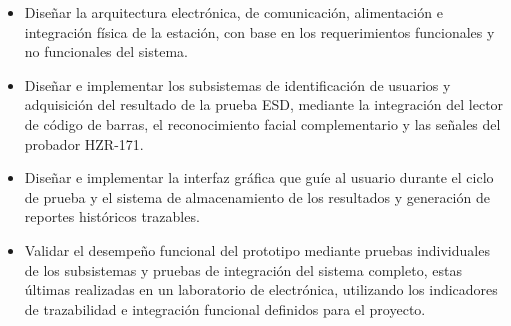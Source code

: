 \begin{itemize}

\item Diseñar la arquitectura electrónica, de comunicación, alimentación e
integración física de la estación, con base en los requerimientos
funcionales y no funcionales del sistema.

\item Diseñar e implementar los subsistemas de identificación de usuarios y
adquisición del resultado de la prueba ESD, mediante la integración del lector
de código de barras, el reconocimiento facial complementario y las señales del
probador HZR-171.

\item Diseñar e implementar la interfaz gráfica que guíe al usuario durante el
ciclo de prueba y el sistema de almacenamiento de los resultados y generación
de reportes históricos trazables.

\item Validar el desempeño funcional del prototipo mediante pruebas individuales
de los subsistemas y pruebas de integración del sistema completo, estas últimas
realizadas en un laboratorio de electrónica, utilizando los indicadores de
trazabilidad e integración funcional definidos para el proyecto.

\end{itemize}
